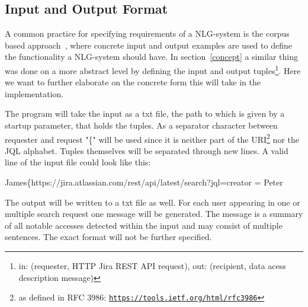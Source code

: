 \documentclass[sigconf,obeyspaces]{acmart}
\begin{document}
\subsection{Input and Output Format}
A common practice for specifying requirements of a NLG-system is the corpus based approach~\cite[5]{reiter_dale}, where concrete input and output examples are used to define the functionality a NLG-system should have. In section~\ref{concept} a similar thing was done on a more abstract level by defining the input and output tuples\footnote{in: (requester, HTTP Jira REST API request), out: (recipient, data acess description message)}. Here we want to further elaborate on the concrete form this will take in the implementation.

The program will take the input as a txt file, the path to which is given by a startup parameter, that holds the tuples. As a separator character between requester and request "\{" will be used since it is neither part of the URI\footnote{as defined in RFC 3986: \texttt{\url{https://tools.ietf.org/html/rfc3986}}} nor the JQL alphabet. Tuples themselves will be separated through new lines. A valid line of the input file could look like this:
\begin{center}
    James\{https://jira.atlassian.com/rest/api/latest/search?jql=creator = Peter
\end{center}

The output will be written to a txt file as well. For each user appearing in one or multiple search request one message will be generated. The message is a summary of all notable accesses detected within the input and may consist of multiple sentences. The exact format will not be further specified.
\end{document}
